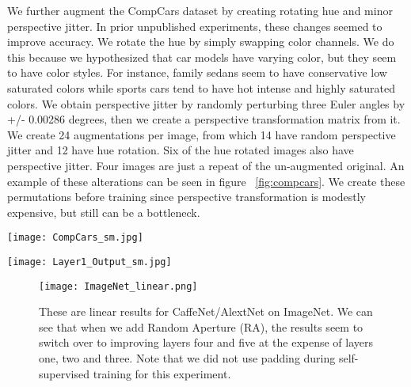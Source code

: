 \documentclass[10pt,twocolumn,letterpaper]{article}
\begin{document}
We further augment the CompCars dataset by creating rotating hue and minor perspective jitter. In prior unpublished experiments, these changes seemed to improve accuracy. We rotate the hue by simply swapping color channels. We do this because we hypothesized that car models have varying color, but they seem to have color styles. For instance, family sedans seem to have conservative low saturated colors while sports cars tend to have hot intense and highly saturated colors. We obtain perspective jitter by randomly perturbing three Euler angles by +/- 0.00286 degrees, then we create a perspective transformation matrix from it. We create 24 augmentations per image, from which 14 have random perspective jitter and 12 have hue rotation. Six of the hue rotated images also have perspective jitter. Four images are just a repeat of the un-augmented original. An example of these alterations can be seen in figure ~\ref{fig:compcars}. We create these permutations before training since perspective transformation is modestly expensive, but still can be a bottleneck.
\begin{figure*}
\centering
\texttt{[image: CompCars\_sm.jpg]}
\caption{These show all 24 augmentations for a single image in CompCars. These variations are applied to all training images. }
\label{fig:compcars}
\end{figure*}
\begin{figure*}
\centering
\texttt{[image: Layer1\_Output\_sm.jpg]}
\caption{These are the first layer filters from several networks which have either been supervise trained on ImageNet or self-supervise trained. All self-supervised networks are using the full set of methods (but not RRM or WV). Even though rotation with classification may mitigate chromatic aberration, the network still forms filters sensitive to it. Thus, we believe it is only a partial solution. The chroma blur networks are all free of chromatic aberration effects and show formation of healthy color filters (especially when compared to color dropping). As an observation, we can zoom to an effective size of 171x171 during self-supervised training; as a result, we see the presence of finer wavelets compared with ImageNet training.}
\label{fig:chroma_blur_layer}
\end{figure*}
\begin{figure}
\centering
\texttt{[image: ImageNet\_linear.png]}
\caption{These are linear results for CaffeNet/AlextNet on ImageNet. We can see that when we add Random Aperture (RA), the results seem to switch over to improving layers four and five at the expense of layers one, two and three. Note that we did not use padding during self-supervised training for this experiment.}
\label{fig:linear_imagenet}
\end{figure}
\end{document}
